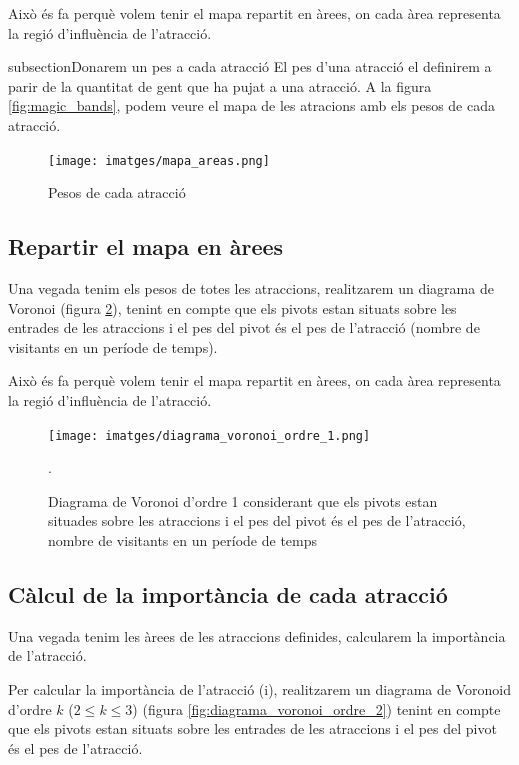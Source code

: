 \documentclass[12pt]{article}
\begin{document}
Això és fa perquè volem tenir el mapa repartit en àrees, on cada àrea representa la regió d'influència de l'atracció.

subsection{Donarem un pes a cada atracció}
El pes d’una atracció el definirem a parir de la quantitat de gent que ha pujat a una atracció. A la figura \ref{fig:magic_bands}, podem veure el mapa de les atracions amb els pesos de cada atracció.

\begin{figure}[h!]
	\centering
	\texttt{[image: imatges/mapa\_areas.png]}\par\vspace{1cm}
	\caption{Pesos de cada atracció}
	\label{fig:mapa_areas}
\end{figure}

\subsection{Repartir el mapa en àrees}
Una vegada tenim els pesos de totes les atraccions, realitzarem un diagrama de Voronoi (figura \ref{fig:diagrama_voronoi_ordre_1}), tenint en compte que els pivots estan situats sobre les entrades de les atraccions i el pes del pivot és el pes de l’atracció (nombre de visitants en un període de temps).
		
Això és fa perquè volem tenir el mapa repartit en àrees, on cada àrea representa la regió d’influència de l’atracció. 

\begin{figure}[h!]
	\centering
	\texttt{[image: imatges/diagrama\_voronoi\_ordre\_1.png]}\par\vspace{1cm}
	\caption{Diagrama de Voronoi d'ordre 1 considerant que els pivots estan situades sobre les atraccions i el pes del pivot és el pes de l'atracció, nombre de visitants en un període de temps}.
	\label{fig:diagrama_voronoi_ordre_1}
\end{figure}

\subsection{Càlcul de la importància de cada atracció}
Una vegada tenim les àrees de les atraccions definides, calcularem la importància de l’atracció.

Per calcular la importància de l'atracció (i), realitzarem un diagrama de Voronoid d'ordre $k$ ($2 \le k \le 3$) (figura \ref{fig:diagrama_voronoi_ordre_2}) tenint en compte que els pivots estan situats sobre les entrades de les atraccions i el pes del pivot és el pes de l’atracció. 
\end{document}
